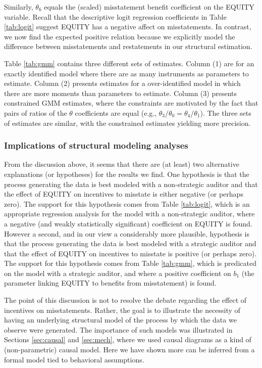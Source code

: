 \documentclass[12pt,reqno,titlepage]{amsart}
\theoremstyle{definition}
\begin{document}
\begin{doublespace}
Similarly, $\theta_6$ equals the (scaled) misstatement benefit coefficient on the EQUITY variable.
Recall that the descriptive logit regression coefficients in Table \ref{tab:logit} suggest EQUITY has a negative affect on misstatements.
In contrast, we now find the expected positive relation because we explicitly model the difference between misstatements and restatements in our structural estimation. 

Table \ref{tab:gmm} contains three different sets of estimates.
Column (1) are for an exactly identified model where there are as many instruments as parameters to estimate.
Column (2) presents estimates for a over-identified model in which
there are more moments than parameters to estimate.
Column (3) presents constrained GMM estimates, where the constraints are motivated by the fact that pairs of ratios of the $\theta$ coefficients are equal (e.g., $\theta_3/\theta_0
= \theta_4/\theta_1$). 
The three sets of estimates are similar, with the constrained estimates yielding more precision.

\subsubsection{Implications of structural modeling analyses}
From the discussion above, it seems that there are (at least) two alternative explanations (or hypotheses) for the results we find.
One hypothesis is that the process generating the data is best modeled with a non-strategic auditor and that the effect of EQUITY on incentives to misstate is either negative (or perhaps zero).
The support for this hypothesis comes from Table \ref{tab:logit}, which is an appropriate regression analysis for the model with a non-strategic auditor, where a negative (and weakly statistically significant) coefficient on EQUITY is found.
However a second, and in our view a considerably more plausible, hypothesis is that the process generating the data is best modeled with a strategic auditor and that the effect of EQUITY on incentives to misstate is positive (or perhaps zero).
The support for this hypothesis comes from Table \ref{tab:gmm}, which is predicated on the model with a strategic auditor, and where a positive coefficient on $b_1$ (the parameter linking EQUITY to benefits from misstatement) is found.

The point of this discussion is not to resolve the debate regarding the effect of incentives on misstatements. 
Rather, the goal is to illustrate the necessity of having an underlying structural model of the process by which the data we observe were generated.
The importance of such models was illustrated in Sections \ref{sec:causal} and \ref{sec:mech}, where we used causal diagrams as a kind of (non-parametric) causal model.
Here we have shown more can be inferred from a formal model tied to behavioral assumptions.


\end{doublespace}
\end{document}
